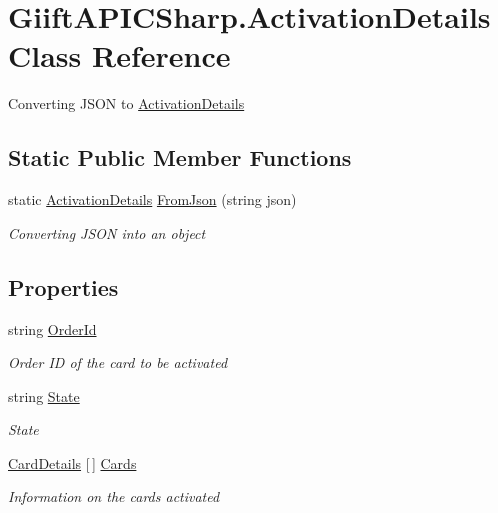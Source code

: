 \hypertarget{class_giift_a_p_i_c_sharp_1_1_activation_details}{}\section{Giift\+A\+P\+I\+C\+Sharp.\+Activation\+Details Class Reference}
\label{class_giift_a_p_i_c_sharp_1_1_activation_details}


Converting J\+S\+ON to \hyperlink{class_giift_a_p_i_c_sharp_1_1_activation_details}{Activation\+Details}  


\subsection*{Static Public Member Functions}
\begin{DoxyCompactItemize}
\item 
static \hyperlink{class_giift_a_p_i_c_sharp_1_1_activation_details}{Activation\+Details} \hyperlink{class_giift_a_p_i_c_sharp_1_1_activation_details_abdd25b35a564ad4a01f0932102303e39}{From\+Json} (string json)
\begin{DoxyCompactList}\small\item\em Converting J\+S\+ON into an object \end{DoxyCompactList}\end{DoxyCompactItemize}
\subsection*{Properties}
\begin{DoxyCompactItemize}
\item 
string \hyperlink{class_giift_a_p_i_c_sharp_1_1_activation_details_ac8113e10092e96a5430621c0462d3395}{Order\+Id}
\begin{DoxyCompactList}\small\item\em Order ID of the card to be activated \end{DoxyCompactList}\item 
string \hyperlink{class_giift_a_p_i_c_sharp_1_1_activation_details_a531e51763af8466e267f7299ab132fd5}{State}
\begin{DoxyCompactList}\small\item\em State \end{DoxyCompactList}\item 
\hyperlink{class_giift_a_p_i_c_sharp_1_1_card_details}{Card\+Details} \mbox{[}$\,$\mbox{]} \hyperlink{class_giift_a_p_i_c_sharp_1_1_activation_details_a228857c9f8350a484d60ad95f229e749}{Cards}
\begin{DoxyCompactList}\small\item\em Information on the cards activated \end{DoxyCompactList}\end{DoxyCompactItemize}


